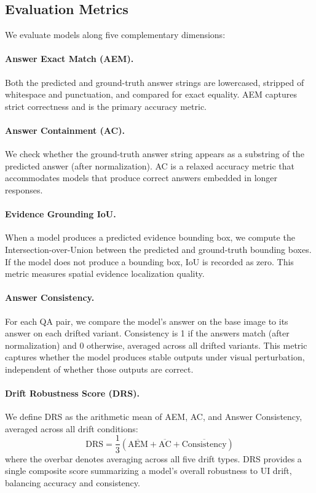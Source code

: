 \subsection{Evaluation Metrics}
\label{sec:method:metrics}

We evaluate models along five complementary dimensions:

\paragraph{Answer Exact Match (AEM).} Both the predicted and ground-truth answer strings are lowercased, stripped of whitespace and punctuation, and compared for exact equality. AEM captures strict correctness and is the primary accuracy metric.

\paragraph{Answer Containment (AC).} We check whether the ground-truth answer string appears as a substring of the predicted answer (after normalization). AC is a relaxed accuracy metric that accommodates models that produce correct answers embedded in longer responses.

\paragraph{Evidence Grounding IoU.} When a model produces a predicted evidence bounding box, we compute the Intersection-over-Union between the predicted and ground-truth bounding boxes. If the model does not produce a bounding box, IoU is recorded as zero. This metric measures spatial evidence localization quality.

\paragraph{Answer Consistency.} For each QA pair, we compare the model's answer on the base image to its answer on each drifted variant. Consistency is 1 if the answers match (after normalization) and 0 otherwise, averaged across all drifted variants. This metric captures whether the model produces stable outputs under visual perturbation, independent of whether those outputs are correct.

\paragraph{Drift Robustness Score (DRS).} We define DRS as the arithmetic mean of AEM, AC, and Answer Consistency, averaged across all drift conditions:
\begin{equation}
    \text{DRS} = \frac{1}{3}\left(\overline{\text{AEM}} + \overline{\text{AC}} + \overline{\text{Consistency}}\right)
    \label{eq:drs}
\end{equation}
where the overbar denotes averaging across all five drift types. DRS provides a single composite score summarizing a model's overall robustness to UI drift, balancing accuracy and consistency.
